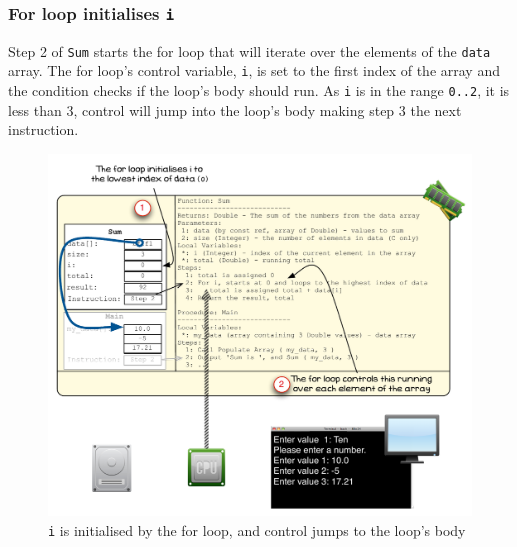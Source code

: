 
\clearpage
\subsubsection{For loop initialises \texttt{i}} %
\label{ssub:for_loop_initialises_i}

Step 2 of \texttt{Sum} starts the for loop that will iterate over the elements of the \texttt{data} array. The for loop's control variable, \texttt{i}, is set to the first index of the array and the condition checks if the loop's body should run. As \texttt{i} is in the range \texttt{0..2}, it is less than 3, control will jump into the loop's body making step 3 the next instruction.

\begin{figure}[htbp]
   \centering
   \includegraphics[width=\textwidth]{./topics/arrays/images/Sum3} 
   \caption{\texttt{i} is initialised by the for loop, and control jumps to the loop's body}
   \label{fig:sum-array-vis-3}
\end{figure}


